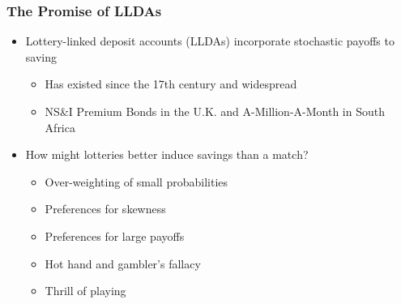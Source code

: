 \documentclass{beamer}
\begin{document}
\begin{frame} \frametitle{The Promise of LLDAs} \pause
	
	\begin{itemize}
	\item Lottery-linked deposit accounts (LLDAs) incorporate stochastic payoffs to saving \pause
		\begin{itemize}
		\item Has existed since the 17th century and widespread \pause
		\item NS\&I Premium Bonds in the U.K. and A-Million-A-Month in South Africa \pause
		\end{itemize}
	\item How might lotteries better induce savings than a match? \pause
		\begin{itemize}
		\item Over-weighting of small probabilities \pause
		\item Preferences for skewness \pause
		\item Preferences for large payoffs \pause
		\item Hot hand and gambler's fallacy \pause
		\item Thrill of playing \pause
		\end{itemize}
	\end{itemize}

\end{frame}

\end{document}
